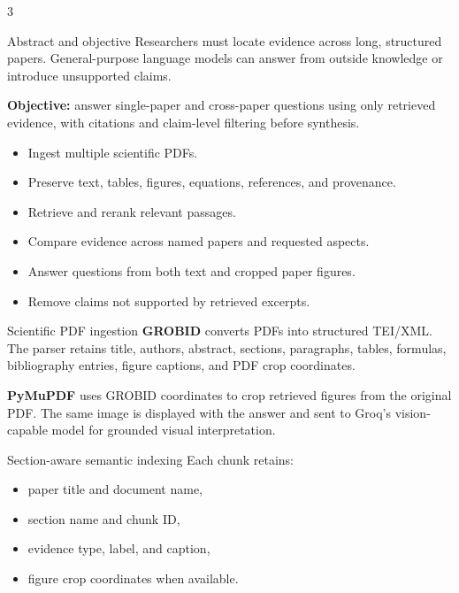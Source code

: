 \documentclass[a0,portrait]{a0poster}
\begin{document}
\small
\begin{multicols}{3}

\begin{posterbox}{Abstract and objective}
Researchers must locate evidence across long, structured papers. General-purpose
language models can answer from outside knowledge or introduce unsupported claims.

\textbf{Objective:} answer single-paper and cross-paper questions using only
retrieved evidence, with citations and claim-level filtering before synthesis.

\begin{itemize}
  \item Ingest multiple scientific PDFs.
  \item Preserve text, tables, figures, equations, references, and provenance.
  \item Retrieve and rerank relevant passages.
  \item Compare evidence across named papers and requested aspects.
  \item Answer questions from both text and cropped paper figures.
  \item Remove claims not supported by retrieved excerpts.
\end{itemize}
\end{posterbox}

\begin{posterbox}{Scientific PDF ingestion}
\textbf{GROBID} converts PDFs into structured TEI/XML. The parser retains title,
authors, abstract, sections, paragraphs, tables, formulas, bibliography entries,
figure captions, and PDF crop coordinates.

\begin{center}
\end{center}

\textbf{PyMuPDF} uses GROBID coordinates to crop retrieved figures from the
original PDF. The same image is displayed with the answer and sent to Groq's
vision-capable model for grounded visual interpretation.
\end{posterbox}

\begin{posterbox}{Section-aware semantic indexing}
Each chunk retains:
\begin{itemize}
  \item paper title and document name,
  \item section name and chunk ID,
  \item evidence type, label, and caption,
  \item figure crop coordinates when available.
\end{itemize}


\end{posterbox}
\end{multicols}
\end{document}
